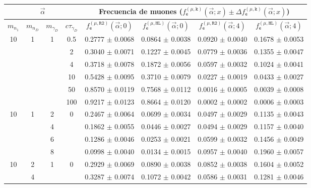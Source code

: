 \begin{table}[!t]
\footnotesize
\begin{tabular}{|cccccccc|}
\hline
\multicolumn{4}{|c|}{$\vec{\alpha}$} & \multicolumn{4}{|c|}{Frecuencia de muones ($f^{(\mu, \texttt{k})}_\textsf{e} (\vec{\alpha}; x) \pm \Delta f^{(\mu, \texttt{k})}_\textsf{e} (\vec{\alpha}; x)$)} \\
\hline
$m_{n_1}$ & $m_{n_D}$ & $m_{\gamma_D}$ & $c\tau_{\gamma_D}$ & 
$f^{(\mu, \texttt{R2})}_\textsf{e} (\vec{\alpha}; 0)$ & 
$f^{(\mu, \texttt{HL})}_\textsf{e} (\vec{\alpha}; 0)$ & 
$f^{(\mu, \texttt{R2})}_\textsf{e} (\vec{\alpha}; 4)$ & 
$f^{(\mu, \texttt{HL})}_\textsf{e} (\vec{\alpha}; 4)$ \\
\hline
10 & 1 & 1 & 0.5 & 0.2777 $\pm$ 0.0068 & 0.0864 $\pm$ 0.0038 & 0.0920 $\pm$ 0.0040 & 0.1678 $\pm$ 0.0053\\
& & & 2 & 0.3040 $\pm$ 0.0071 & 0.1227 $\pm$ 0.0045 & 0.0779 $\pm$ 0.0036 & 0.1355 $\pm$ 0.0047 \\
& & & 4 & 0.3718 $\pm$ 0.0078 & 0.1872 $\pm$ 0.0056 & 0.0597 $\pm$ 0.0032 & 0.1024 $\pm$ 0.0041\\
& & & 10 & 0.5428 $\pm$ 0.0095 & 0.3710 $\pm$ 0.0079 & 0.0227 $\pm$ 0.0019 & 0.0433 $\pm$ 0.0027\\
& & & 50 & 0.8570 $\pm$ 0.0119 & 0.7568 $\pm$ 0.0112 & 0.0016 $\pm$ 0.0005 & 0.0039 $\pm$ 0.0008\\
& & & 100 & 0.9217 $\pm$ 0.0123 & 0.8664 $\pm$ 0.0120 & 0.0002 $\pm$ 0.0002 & 0.0006 $\pm$ 0.0003\\
\hline
10 & 1 & 2 & 0 & 0.2467 $\pm$ 0.0064 & 0.0699 $\pm$ 0.0034 & 0.0497 $\pm$ 0.0029 & 0.1135 $\pm$ 0.0043 \\
& & 4 & & 0.1862 $\pm$ 0.0055 & 0.0446 $\pm$ 0.0027 & 0.0494 $\pm$ 0.0029 & 0.1157 $\pm$ 0.0040 \\
& & 6 & & 0.1286 $\pm$ 0.0046 & 0.0253 $\pm$ 0.0021 & 0.0599 $\pm$ 0.0032 & 0.1456 $\pm$ 0.0049\\
& & 8 & & 0.0998 $\pm$ 0.0040 & 0.0134 $\pm$ 0.0015 & 0.0957 $\pm$ 0.0040 & 0.1960 $\pm$ 0.0057\\
\hline
10 & 2 & 1 & 0 & 0.2929 $\pm$ 0.0069 & 0.0890 $\pm$ 0.0038 & 0.0852 $\pm$ 0.0038 & 0.1604 $\pm$ 0.0052\\
& 4 & & & 0.3287 $\pm$ 0.0074 & 0.1072 $\pm$ 0.0042 & 0.0586 $\pm$ 0.0031 & 0.1281 $\pm$ 0.0046 \\

\end{tabular}
\end{table}

